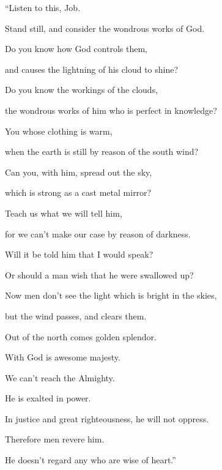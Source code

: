 {\par }{\BB \par }{\Q {}“Listen to this, Job.
\par }{\QB Stand still, and consider the wondrous works of God.
\par }{\Q {}Do you know how God controls them,
\par }{\QB and causes the lightning of his cloud to shine?
\par }{\Q {}Do you know the workings of the clouds,
\par }{\QB the wondrous works of him who is perfect in knowledge?
\par }{\Q {}You whose clothing is warm,
\par }{\QB when the earth is still by reason of the south wind?
\par }{\Q {}Can you, with him, spread out the sky,
\par }{\QB which is strong as a cast metal mirror?
\par }{\Q {}Teach us what we will tell him,
\par }{\QB for we can’t make our case by reason of darkness.
\par }{\Q {}Will it be told him that I would speak?
\par }{\QB Or should a man wish that he were swallowed up?
\par }{\BB \par }{\Q {}Now men don’t see the light which is bright in the skies,
\par }{\QB but the wind passes, and clears them.
\par }{\Q {}Out of the north comes golden splendor.
\par }{\QB With God is awesome majesty.
\par }{\Q {}We can’t reach the Almighty.
\par }{\QB He is exalted in power.
\par }{\QB In justice and great righteousness, he will not oppress.
\par }{\Q {}Therefore men revere him.
\par }{\QB He doesn’t regard any who are wise of heart.”
\par }{\BB \par }
